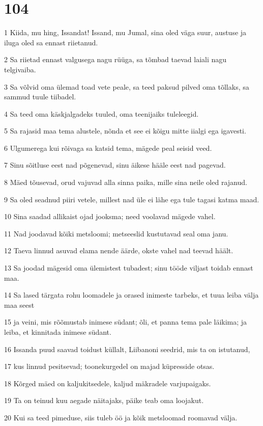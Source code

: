 \chapter{104}

\par 1 Kiida, mu hing, Issandat! Issand, mu Jumal, sina oled väga suur, austuse ja iluga oled sa ennast riietanud.
\par 2 Sa riietad ennast valgusega nagu rüüga, sa tõmbad taevad laiali nagu telgivaiba.
\par 3 Sa võlvid oma ülemad toad vete peale, sa teed paksud pilved oma tõllaks, sa sammud tuule tiibadel.
\par 4 Sa teed oma käskjalgadeks tuuled, oma teenijaiks tuleleegid.
\par 5 Sa rajasid maa tema alustele, nõnda et see ei kõigu mitte iialgi ega igavesti.
\par 6 Ulgumerega kui rõivaga sa katsid tema, mägede peal seisid veed.
\par 7 Sinu sõitluse eest nad põgenevad, sinu äikese hääle eest nad pagevad.
\par 8 Mäed tõusevad, orud vajuvad alla sinna paika, mille sina neile oled rajanud.
\par 9 Sa oled seadnud piiri vetele, millest nad üle ei lähe ega tule tagasi katma maad.
\par 10 Sina saadad allikaist ojad jooksma; need voolavad mägede vahel.
\par 11 Nad joodavad kõiki metsloomi; metseeslid kustutavad seal oma janu.
\par 12 Taeva linnud asuvad elama nende äärde, okste vahel nad teevad häält.
\par 13 Sa joodad mägesid oma ülemistest tubadest; sinu tööde viljast toidab ennast maa.
\par 14 Sa lased tärgata rohu loomadele ja orased inimeste tarbeks, et tuua leiba välja maa seest
\par 15 ja veini, mis rõõmustab inimese südant; õli, et panna tema pale läikima; ja leiba, et kinnitada inimese südant.
\par 16 Issanda puud saavad toidust küllalt, Liibanoni seedrid, mis ta on istutanud,
\par 17 kus linnud pesitsevad; toonekurgedel on majad küpresside otsas.
\par 18 Kõrged mäed on kaljukitsedele, kaljud mäkradele varjupaigaks.
\par 19 Ta on teinud kuu aegade näitajaks, päike teab oma loojakut.
\par 20 Kui sa teed pimeduse, siis tuleb öö ja kõik metsloomad roomavad välja.

